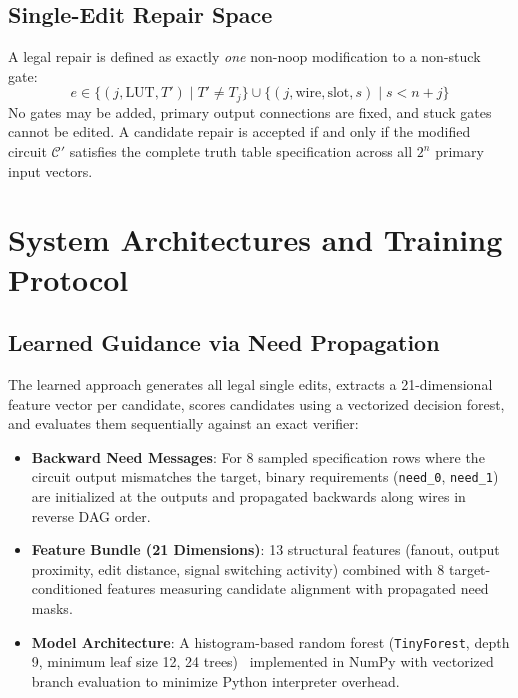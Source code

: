 \documentclass[11pt,a4paper]{article}
\begin{document}
\subsection{Single-Edit Repair Space}
A legal repair is defined as exactly \textit{one} non-noop modification to a non-stuck gate:
\begin{equation}
    e \in \{(j, \text{LUT}, T') \mid T' \ne T_j\} \cup \{(j, \text{wire}, \text{slot}, s) \mid s < n + j\}
\end{equation}
No gates may be added, primary output connections are fixed, and stuck gates cannot be edited. A candidate repair is accepted if and only if the modified circuit $\mathcal{C}'$ satisfies the complete truth table specification across all $2^n$ primary input vectors.

\section{System Architectures and Training Protocol}

\subsection{Learned Guidance via Need Propagation}
The learned approach generates all legal single edits, extracts a 21-dimensional feature vector per candidate, scores candidates using a vectorized decision forest, and evaluates them sequentially against an exact verifier:
\begin{itemize}
    \item \textbf{Backward Need Messages}: For 8 sampled specification rows where the circuit output mismatches the target, binary requirements (\texttt{need\_0}, \texttt{need\_1}) are initialized at the outputs and propagated backwards along wires in reverse DAG order.
    \item \textbf{Feature Bundle (21 Dimensions)}: 13 structural features (fanout, output proximity, edit distance, signal switching activity) combined with 8 target-conditioned features measuring candidate alignment with propagated need masks.
    \item \textbf{Model Architecture}: A histogram-based random forest (\texttt{TinyForest}, depth 9, minimum leaf size 12, 24 trees)~\citep{breiman2001random} implemented in NumPy with vectorized branch evaluation to minimize Python interpreter overhead.
\end{itemize}
\end{document}
